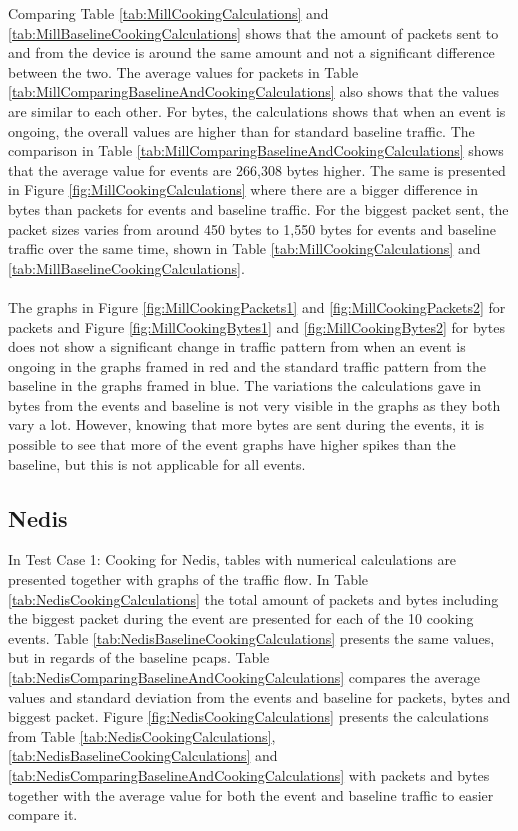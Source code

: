 Comparing Table \ref{tab:MillCookingCalculations} and \ref{tab:MillBaselineCookingCalculations} shows that the amount of packets sent to and from the device is around the same amount and not a significant difference between the two. The average values for packets in Table \ref{tab:MillComparingBaselineAndCookingCalculations} also shows that the values are similar to each other. For bytes, the calculations shows that when an event is ongoing, the overall values are higher than for standard baseline traffic. The comparison in Table \ref{tab:MillComparingBaselineAndCookingCalculations} shows that the average value for events are 266,308 bytes higher. The same is presented in Figure \ref{fig:MillCookingCalculations} where there are a bigger difference in bytes than packets for events and baseline traffic. For the biggest packet sent, the packet sizes varies from around 450 bytes to 1,550 bytes for events and baseline traffic over the same time, shown in Table \ref{tab:MillCookingCalculations} and \ref{tab:MillBaselineCookingCalculations}. 
\\\\
The graphs in Figure \ref{fig:MillCookingPackets1} and \ref{fig:MillCookingPackets2} for packets and Figure \ref{fig:MillCookingBytes1} and \ref{fig:MillCookingBytes2} for bytes does not show a significant change in traffic pattern from when an event is ongoing in the graphs framed in red and the standard traffic pattern from the baseline in the graphs framed in blue. The variations the calculations gave in bytes from the events and baseline is not very visible in the graphs as they both vary a lot. However, knowing that more bytes are sent during the events, it is possible to see that more of the event graphs have higher spikes than the baseline, but this is not applicable for all events. 

\newpage
\subsection{Nedis}
In Test Case 1: Cooking for Nedis, tables with numerical calculations are presented together with graphs of the traffic flow. In Table \ref{tab:NedisCookingCalculations} the total amount of packets and bytes including the biggest packet during the event are presented for each of the 10 cooking events. Table \ref{tab:NedisBaselineCookingCalculations} presents the same values, but in regards of the baseline pcaps. Table \ref{tab:NedisComparingBaselineAndCookingCalculations} compares the average values and standard deviation from the events and baseline for packets, bytes and biggest packet. Figure \ref{fig:NedisCookingCalculations} presents the calculations from Table \ref{tab:NedisCookingCalculations}, \ref{tab:NedisBaselineCookingCalculations} and \ref{tab:NedisComparingBaselineAndCookingCalculations} with packets and bytes together with the average value for both the event and baseline traffic to easier compare it.  

